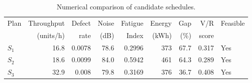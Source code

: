 \begin{table}[htbp]
\centering
\caption{Numerical comparison of candidate schedules.}
\label{tab:numerical-sim}
\small
\begin{tabular}{@{}lrrrrrrrl@{}}
\toprule
Plan & Throughput & Defect & Noise & Fatigue & Energy & Gap & V/R & Feasible \\
     & (units/h)  & rate   & (dB)  & Index   & (kWh)  & (\%) & score &         \\
\midrule
$S_{1}$ & 16.8 & 0.0078 & 78.6 & 0.2996 & 373 & 67.7 & 0.317 & Yes \\
$S_{2}$ & 18.6 & 0.0099 & 84.0 & 0.5942 & 461 & 64.3 & 0.289 & Yes \\
$S_{3}$ & 32.9 & 0.008 & 79.8 & 0.3169 & 376 & 36.7 & 0.408 & Yes \\
\bottomrule
\end{tabular}
\end{table}
